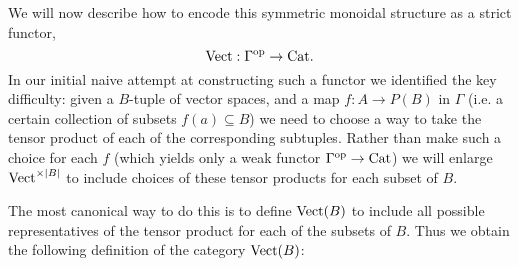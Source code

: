 \documentclass[a4paper]{amsart}
\begin{document}
We will now describe how to encode this symmetric monoidal structure as a strict functor,
\begin{equation*}
	\mathrm{Vect}: \Gamma^\text{op} \to \mathrm{Cat}.
\end{equation*}  
In our initial naive attempt at constructing such a functor we identified the key difficulty: given a $B$-tuple of vector spaces, and a map $f: A \to P(B)$ in $\Gamma$ (i.e. a certain collection of subsets $f(a) \subseteq B$) we need to choose a way to take the tensor product of each of the corresponding subtuples. Rather than make such a choice for each $f$ (which yields only a weak functor $\Gamma^\text{op} \to \mathrm{Cat}$) we will enlarge $\mathrm{Vect}^{\times |B|}$ to include choices of these tensor products for each subset of $B$. 

The most canonical way to do this is to define $\mathrm{Vect}(B)$ to include all possible representatives of the tensor product for each of the subsets of $B$. Thus we obtain the following definition of the category $\mathrm{Vect}(B)$: 
\end{document}
